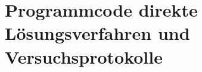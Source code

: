\chapter{Programmcode direkte Lösungsverfahren und Versuchsprotokolle}\label{Anhang:DirektV}

%
%
%
